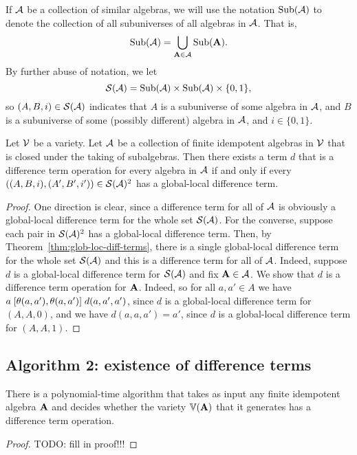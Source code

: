 If $\mathcal{A}$ be a collection of similar algebras, we will use the notation
$\operatorname{Sub}(\mathcal{A})$ to denote the collection of all subuniverses of all algebras in
$\mathcal{A}$.
That is,
\[
\operatorname{Sub}(\mathcal{A}) = \bigcup_{\mathbf{A} \in \mathcal{A}} \operatorname{Sub}(\mathbf{A}).
\]
By further abuse of notation, we let
\[
\mathcal{S}(\mathcal{A}) = \operatorname{Sub}(\mathcal{A}) \times \operatorname{Sub}(\mathcal{A}) \times \{0,1\},
\]
so $(A, B, i)\in \mathcal{S}(\mathcal{A})$ indicates that
$A$ is a subuniverse of some algebra in $\mathcal{A}$,
and $B$ is a subuniverse of some (possibly different) algebra in $\mathcal{A}$,
and $i\in \{0,1\}$.
\begin{cor}
  \label{cor:glob-loc-diff-term}
  Let $\mathcal{V}$ be a variety.  Let $\mathcal{A}$ be a collection of finite idempotent
  algebras in $\mathcal{V}$ that is closed under the taking of subalgebras.
  Then there exists a term $d$ that is a difference term operation for every
  algebra in $\mathcal{A}$ if and only if every
  $((A,B,i), (A',B',i')) \in \mathcal{S}(\mathcal{A})^2$ has a global-local
  difference term.
\end{cor}
\begin{proof}
  One direction is clear, since a difference term for all of $\mathcal{A}$ is
  obviously a global-local difference term for the whole set $\mathcal{S}(\mathcal{A})$.
  For the converse, suppose
  each pair in $\mathcal{S}(\mathcal{A})^2$ has a global-local
  difference term. Then, by Theorem~\ref{thm:glob-loc-diff-terms},
  there is a single global-local difference term for the whole set
  $\mathcal{S}(\mathcal{A})$
  and this is a difference term for all of $\mathcal{A}$.  Indeed, suppose $d$ is a
  global-local difference term for $\mathcal{S}(\mathcal{A})$ and fix $\mathbf{A} \in \mathcal{A}$. We show
  that $d$ is a difference term operation for $\mathbf{A}$. Indeed,
  so for all  $a, a' \in A$ we have 
  $a \mathrel{[\theta(a,a'), \theta(a,a')]} d(a,a',a')$,
  since $d$ is a global-local difference term for $(A,A,0)$, and we have
  $d(a,a,a') = a'$, since $d$ is a global-local difference term for
  $(A,A,1)$.
\end{proof}


\subsection*{Algorithm 2: existence of difference terms}
\begin{cor}
  There is a polynomial-time algorithm that takes as input
  any finite idempotent algebra $\mathbf{A}$ and decides whether
  the variety $\operatorname{\mathbb{V}}(\mathbf{A})$ that it generates
  has a difference term operation.
\end{cor}
\begin{proof}
  TODO: fill in proof!!!
\end{proof}


